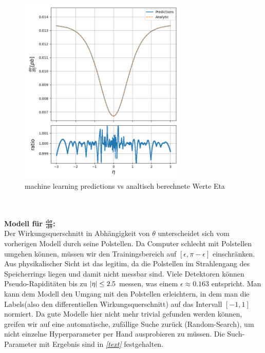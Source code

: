 \begin{figure}[tbp]
	\centering
	\includegraphics[width=8cm]{graphics/partonic_eta_model_eta_ratio}
	\caption{machine learning predictions vs analtisch berechnete Werte Eta}
	\label{partonic_eta_model}
\end{figure}
 \\
 \\
\textbf{Modell für $\mathbf{\frac{d\sigma}{d\theta}}$:} \\
Der Wirkungsquerschnitt in Abhängigkeit von $\theta$ unterscheidet sich vom vorherigen Modell durch seine Polstellen. Da Computer schlecht mit Polstellen umgehen können, müssen wir den Trainingsbereich auf $[\epsilon, \pi-\epsilon]$ einschränken. Aus physikalischer Sicht ist das legitim, da die Polstellen im Strahlengang des Speicherrings liegen und damit nicht messbar sind. Viele Detektoren können Pseudo-Rapiditäten bis zu $\abs{\eta} \leq 2.5$ messen, was einem $\epsilon \approx 0.163$ entspricht. Man kann dem Modell den Umgang mit den Polstellen erleichtern, in dem man die Labels(also den differentiellen Wirkungsquerschnitt) auf das Intervall $[-1, 1]$ normiert. Da gute Modelle hier nicht mehr trivial gefunden werden können, greifen wir auf eine automatische, zufällige Suche zurück (Random-Search), um nicht einzelne Hyperparameter per Hand ausprobieren zu müssen. Die Such-Parameter mit Ergebnis sind in \textit{\autoref{text}} festgehalten.
